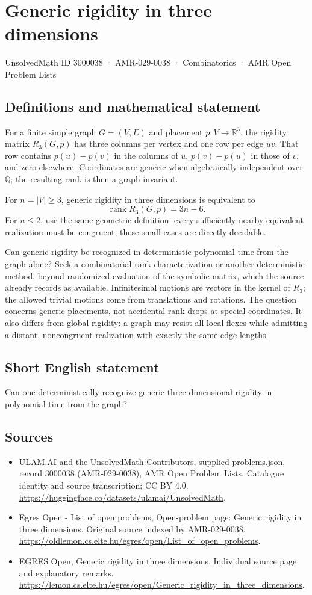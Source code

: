 \documentclass[11pt,a4paper]{article}
\begin{document}
\section*{Generic rigidity in three dimensions}\label{3000038}
{\small UnsolvedMath ID 3000038 · AMR-029-0038 · Combinatorics · AMR Open Problem Lists}
\subsection{Definitions and mathematical statement}
For a finite simple graph $G=(V,E)$ and placement $p:V\to\mathbb R^3$,
the rigidity matrix $R_3(G,p)$ has three columns per vertex and one row
per edge $uv$. That row contains $p(u)-p(v)$ in the columns of $u$,
$p(v)-p(u)$ in those of $v$, and zero elsewhere. Coordinates are generic
when algebraically independent over $\mathbb Q$; the resulting rank is
then a graph invariant.

For $n=|V|\ge3$, generic rigidity in three dimensions is equivalent to
\[
                           \operatorname{rank}R_3(G,p)=3n-6.
\]
For $n\le2$, use the same geometric definition: every sufficiently
nearby equivalent realization must be congruent; these small cases
are directly decidable.

Can generic rigidity be recognized in deterministic polynomial time
from the graph alone? Seek a combinatorial rank characterization or
another deterministic method, beyond randomized evaluation of the
symbolic matrix, which the source already records as available.
Infinitesimal motions are vectors in the kernel of $R_3$; the allowed
trivial motions come from translations and rotations. The question
concerns generic placements, not accidental rank drops at special
coordinates. It also differs from global rigidity: a graph may resist
all local flexes while admitting a distant, noncongruent realization
with exactly the same edge lengths.
\subsection{Short English statement}
Can one deterministically recognize generic three-dimensional
rigidity in polynomial time from the graph?
\subsection{Sources}
\begin{itemize}
\item[S1] ULAM.AI and the UnsolvedMath Contributors, supplied problems.json, record 3000038 (AMR-029-0038), AMR Open Problem Lists. Catalogue identity and source transcription; CC BY 4.0.
\url{https://huggingface.co/datasets/ulamai/UnsolvedMath}.
\item[S2] Egres Open - List of open problems, Open-problem page: Generic rigidity in three dimensions. Original source indexed by AMR-029-0038.
\url{https://oldlemon.cs.elte.hu/egres/open/List_of_open_problems}.
\item[S3] EGRES Open, Generic rigidity in three dimensions. Individual source page and explanatory remarks.
\url{https://lemon.cs.elte.hu/egres/open/Generic_rigidity_in_three_dimensions}.
\end{itemize}
\end{document}

